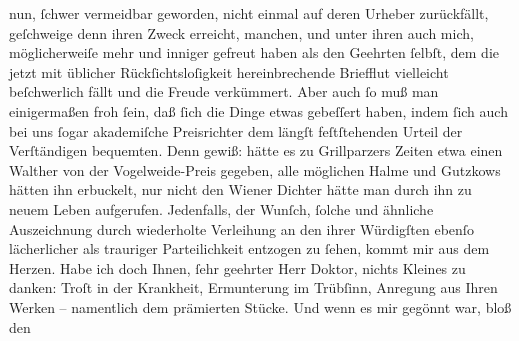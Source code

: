 \begin{ledgroupsized}[t]{13cm}
               nun, ſchwer vermeidbar geworden, nicht einmal auf deren Urheber zurückfällt,
               geſchweige denn ihren Zweck erreicht, manchen, und unter ihren auch mich,
               möglicherweiſe mehr und inniger gefreut haben als den Geehrten ſelbſt, dem die jetzt
               mit üblicher Rückſichtsloſigkeit hereinbrechende Briefflut vielleicht beſchwerlich
               fällt {\pb}und die Freude verkümmert. Aber
               auch ſo muß man einigermaßen froh ſein, daß ſich die Dinge etwas gebeſſert haben,
               indem ſich auch bei uns ſogar akademiſche Preisrichter dem längſt feſtſtehenden
               Urteil der Verſtändigen bequemten. Denn gewiß: hätte es zu Grillparzers Zeiten etwa einen Walther von der Vogelweide-Preis gegeben, alle möglichen Halme und Gutzkows hätten
               ihn erbuckelt, nur nicht den Wiener Dichter hätte man durch ihn zu neuem Leben
               aufgerufen.\pend
           \pstart
           Jedenfalls, der Wunſch, ſolche und ähnliche Auszeichnung durch wiederholte {\pb}Verleihung an den ihrer Würdigſten ebenſo
               lächerlicher als trauriger Parteilichkeit entzogen zu ſehen, kommt mir aus dem
               Herzen. Habe ich doch Ihnen, ſehr geehrter Herr Doktor, nichts Kleines zu danken:
               Troſt in der Krankheit, Ermunterung im Trübſinn, Anregung aus Ihren Werken –
               namentlich dem prämierten Stücke.
               Und wenn es mir gegönnt war, bloß den \label{K_L01751_2v}
\end{ledgroupsized}
